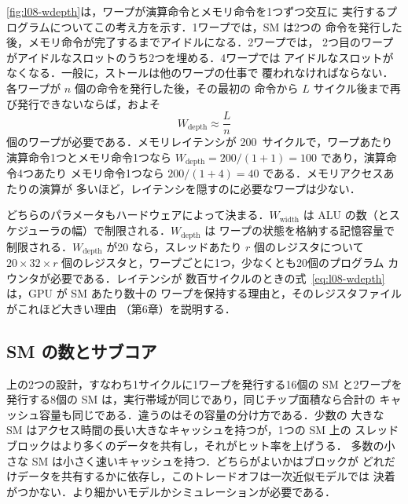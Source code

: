 \documentclass[../main.tex]{subfiles}
\begin{document}
\cref{fig:l08-wdepth}は，ワープが演算命令とメモリ命令を1つずつ交互に
実行するプログラムについてこの考え方を示す．1ワープでは，SM は2つの
命令を発行した後，メモリ命令が完了するまでアイドルになる．2ワープでは，
2つ目のワープがアイドルなスロットのうち2つを埋める．4ワープでは
アイドルなスロットがなくなる．一般に，ストールは他のワープの仕事で
覆われなければならない．各ワープが $n$ 個の命令を発行した後，その最初の
命令から $L$ サイクル後まで再び発行できないならば，およそ
\begin{equation}
  W_{\text{depth}} \approx \frac{L}{n}
  \label{eq:l08-wdepth}
\end{equation}
個のワープが必要である．メモリレイテンシが
\num{200}~サイクルで，ワープあたり演算命令1つとメモリ命令1つなら
$W_{\text{depth}} = 200/(1+1) = 100$ であり，演算命令4つあたり
メモリ命令1つなら $200/(1+4) = 40$ である．メモリアクセスあたりの演算が
多いほど，レイテンシを隠すのに必要なワープは少ない．

どちらのパラメータもハードウェアによって決まる．$W_{\text{width}}$ は
ALU の数（とスケジューラの幅）で制限される．$W_{\text{depth}}$ は
ワープの状態を格納する記憶容量で制限される．$W_{\text{depth}}$ が20
なら，スレッドあたり $r$ 個のレジスタについて $20 \times 32 \times r$
個のレジスタと，ワープごとに1つ，少なくとも20個のプログラム
カウンタが必要である．レイテンシが
数百サイクルのときの式~\eqref{eq:l08-wdepth}は，GPU が SM あたり数十の
ワープを保持する理由と，そのレジスタファイルがこれほど大きい理由
（第6章）を説明する．

\subsection{SM の数とサブコア}

上の2つの設計，すなわち1サイクルに1ワープを発行する16個の SM と2ワープを
発行する8個の SM は，実行帯域が同じであり，同じチップ面積なら合計の
キャッシュ容量も同じである．違うのはその容量の分け方である．少数の
大きな SM はアクセス時間の長い大きなキャッシュを持つが，1つの SM 上の
スレッドブロックはより多くのデータを共有し，それがヒット率を上げうる．
多数の小さな SM は小さく速いキャッシュを持つ．どちらがよいかはブロックが
どれだけデータを共有するかに依存し，このトレードオフは一次近似モデルでは
決着がつかない．より細かいモデルかシミュレーションが必要である．
\end{document}
